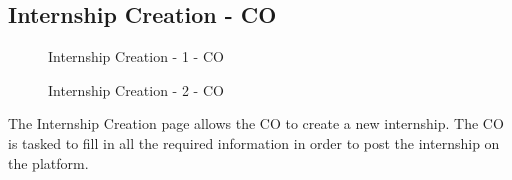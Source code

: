 \subsection{Internship Creation - CO}
\label{subsec:internship-creation-co}%

\begin{figure}[H]
    \centering
    \caption{Internship Creation - 1 - CO}
    \label{fig:internship-creation-1-co}
\end{figure}

\begin{figure}[H]
    \centering
    \caption{Internship Creation - 2 - CO}
    \label{fig:internship-creation-2-co}
\end{figure}

\par The Internship Creation page allows the CO to create a new internship. The CO is tasked to fill in all the
required information in order to post the internship on the platform.


